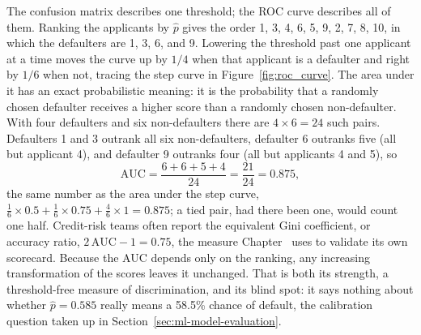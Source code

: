 \documentclass[../ai_in_finance]{subfiles}
\begin{document}
The confusion matrix describes one threshold; the ROC curve describes all of them. Ranking the applicants by $\hat p$ gives the order 1, 3, 4, 6, 5, 9, 2, 7, 8, 10, in which the defaulters are 1, 3, 6, and 9. Lowering the threshold past one applicant at a time moves the curve up by $1/4$ when that applicant is a defaulter and right by $1/6$ when not, tracing the step curve in Figure~\ref{fig:roc_curve}. The area under it has an exact probabilistic meaning: it is the probability that a randomly chosen defaulter receives a higher score than a randomly chosen non-defaulter. With four defaulters and six non-defaulters there are $4\times6=24$ such pairs. Defaulters 1 and 3 outrank all six non-defaulters, defaulter 6 outranks five (all but applicant 4), and defaulter 9 outranks four (all but applicants 4 and 5), so
\begin{equation*}
\text{AUC} = \frac{6+6+5+4}{24} = \frac{21}{24} = 0.875,
\end{equation*}
the same number as the area under the step curve, $\tfrac16 \times 0.5 + \tfrac16 \times 0.75 + \tfrac46 \times 1 = 0.875$; a tied pair, had there been one, would count one half. Credit-risk teams often report the equivalent Gini coefficient, or accuracy ratio, $2\,\text{AUC} - 1 = 0.75$, the measure Chapter~ uses to validate its own scorecard. Because the AUC depends only on the ranking, any increasing transformation of the scores leaves it unchanged. That is both its strength, a threshold-free measure of discrimination, and its blind spot: it says nothing about whether $\hat p = 0.585$ really means a 58.5\% chance of default, the calibration question taken up in Section~\ref{sec:ml-model-evaluation}.
\end{document}

